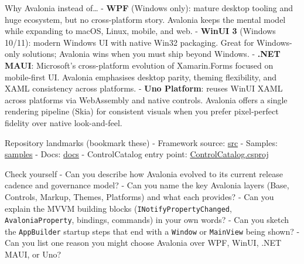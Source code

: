 Why Avalonia instead of\ldots{} - \textbf{WPF} (Windows only): mature
desktop tooling and huge ecosystem, but no cross-platform story.
Avalonia keeps the mental model while expanding to macOS, Linux, mobile,
and web. - \textbf{WinUI 3} (Windows 10/11): modern Windows UI with
native Win32 packaging. Great for Windows-only solutions; Avalonia wins
when you must ship beyond Windows. - \textbf{.NET MAUI}: Microsoft's
cross-platform evolution of Xamarin.Forms focused on mobile-first UI.
Avalonia emphasises desktop parity, theming flexibility, and XAML
consistency across platforms. - \textbf{Uno Platform}: reuses WinUI XAML
across platforms via WebAssembly and native controls. Avalonia offers a
single rendering pipeline (Skia) for consistent visuals when you prefer
pixel-perfect fidelity over native look-and-feel.

Repository landmarks (bookmark these) - Framework source:
\href{https://github.com/AvaloniaUI/Avalonia/tree/master/src}{src} -
Samples:
\href{https://github.com/AvaloniaUI/Avalonia/tree/master/samples}{samples}
- Docs:
\href{https://github.com/AvaloniaUI/Avalonia/tree/master/docs}{docs} -
ControlCatalog entry point:
\href{https://github.com/AvaloniaUI/Avalonia/blob/master/samples/ControlCatalog/ControlCatalog.csproj}{ControlCatalog.csproj}

Check yourself - Can you describe how Avalonia evolved to its current
release cadence and governance model? - Can you name the key Avalonia
layers (Base, Controls, Markup, Themes, Platforms) and what each
provides? - Can you explain the MVVM building blocks
(\passthrough{\lstinline!INotifyPropertyChanged!},
\passthrough{\lstinline!AvaloniaProperty!}, bindings, commands) in your
own words? - Can you sketch the \passthrough{\lstinline!AppBuilder!}
startup steps that end with a \passthrough{\lstinline!Window!} or
\passthrough{\lstinline!MainView!} being shown? - Can you list one
reason you might choose Avalonia over WPF, WinUI, .NET MAUI, or Uno?


